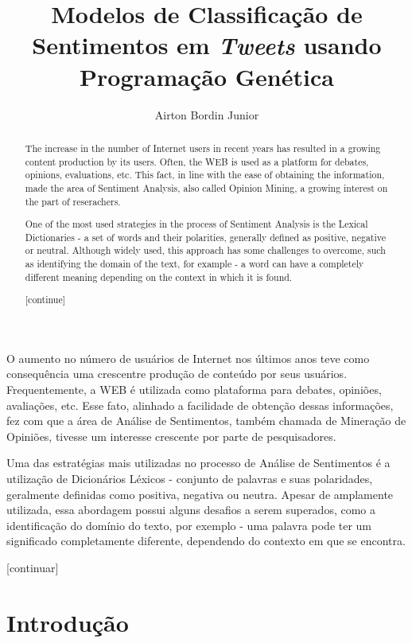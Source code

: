 \documentclass[12pt]{article}
\title{Modelos de Classificação de Sentimentos em \emph{Tweets} usando Programação Genética}
\author{Airton Bordin Junior\inst{1}}
\begin{document}
 

\maketitle

\begin{abstract}
The increase in the number of Internet users in recent years has resulted in a growing content production by its users. Often, the WEB is used as a platform for debates, opinions, evaluations, etc. This fact, in line with the ease of obtaining the information, made the area of Sentiment Analysis, also called Opinion Mining, a growing interest on the part of reserachers.

One of the most used strategies in the process of Sentiment Analysis is the Lexical Dictionaries - a set of words and their polarities, generally defined as positive, negative or neutral. Although widely used, this approach has some challenges to overcome, such as identifying the domain of the text, for example - a word can have a completely different meaning depending on the context in which it is found.

[continue]
\end{abstract}

\begin{resumo} 
O aumento no número de usuários de Internet nos últimos anos teve como consequência uma crescentre produção de conteúdo por seus usuários. Frequentemente, a WEB é utilizada como plataforma para debates, opiniões, avaliações, etc. Esse fato, alinhado a facilidade de obtenção dessas informações, fez com que a área de Análise de Sentimentos, também chamada de Mineração de Opiniões, tivesse um interesse crescente por parte de pesquisadores. 

Uma das estratégias mais utilizadas no processo de Análise de Sentimentos é a utilização de Dicionários Léxicos  - conjunto de palavras e suas polaridades, geralmente definidas como positiva, negativa ou neutra. Apesar de amplamente utilizada, essa abordagem possui alguns desafios a serem superados, como a identificação do domínio do texto, por exemplo - uma palavra pode ter um significado completamente diferente, dependendo do contexto em que se encontra.

[continuar]
\end{resumo}

\section{Introdução}
\end{document}

